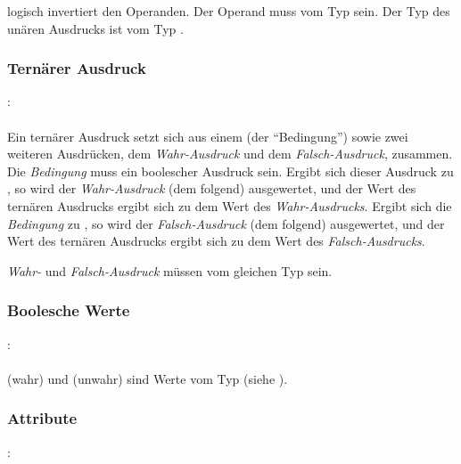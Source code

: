 \op{!} logisch invertiert den Operanden. Der Operand muss vom Typ  sein. Der Typ des unären Ausdrucks ist vom Typ .

\subsubsection{Ternärer Ausdruck}\label{Ternaerer Ausdruck}
:\label{asdr_ternaer}\\
\hspace*{1cm} \Gspace{}\Gspace{} \Gspace\Gt{:}\Gspace{} \\

Ein ternärer Ausdruck setzt sich aus einem  (der "`Bedingung"') sowie zwei weiteren
Ausdrücken, dem \emph{Wahr-Ausdruck} und dem \emph{Falsch-Ausdruck}, zusammen.
Die \emph{Bedingung} muss ein boolescher Ausdruck sein. Ergibt sich dieser Ausdruck zu ,
so wird der \emph{Wahr-Ausdruck} (dem  folgend) ausgewertet, und der Wert des ternären
Ausdrucks ergibt sich zu dem Wert des \emph{Wahr-Ausdrucks}.
Ergibt sich die \emph{Bedingung} zu , so wird der \emph{Falsch-Ausdruck} (dem \kw{:} folgend)
ausgewertet, und der Wert des ternären
Ausdrucks ergibt sich zu dem Wert des \emph{Falsch-Ausdrucks}.

\emph{Wahr-} und \emph{Falsch-Ausdruck} müssen vom gleichen Typ sein.


\subsubsection{Boolesche Werte}\label{Boolesche Werte}
:\label{asdr_konst_bool}\\
\hspace*{1cm}\\

 (wahr) und  (unwahr) sind Werte vom Typ  (siehe ).


\subsubsection{Attribute}\label{Attribute}
:\label{attribut}\\
\hspace*{1cm}\\

